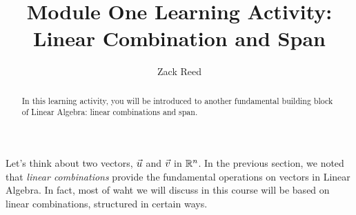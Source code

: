 \documentclass{ximera}
\author{Zack Reed}
\title{Module One Learning Activity: Linear Combination and Span}
\begin{document}
\begin{abstract}

    In this learning activity, you will be introduced to another fundamental building block of Linear Algebra: linear combinations and span.

\end{abstract}
\maketitle

Let's think about two vectors, $\vec{u}$ and $\vec{v}$ in $\mathbb{R}^n$. In the previous section, we noted that \emph{linear combinations} provide the fundamental operations on vectors in Linear Algebra. In fact, most of waht we will discuss in this course will be based on linear combinations, structured in certain ways.
\end{document}
